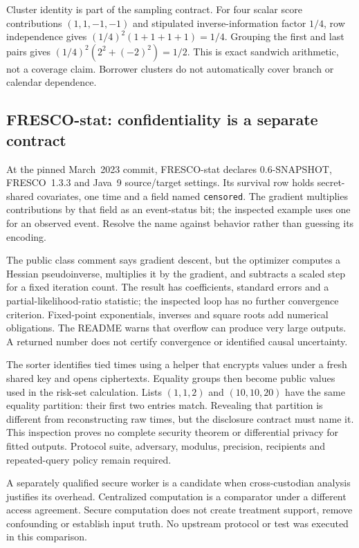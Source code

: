 Cluster identity is part of the sampling contract. For four scalar score
contributions $(1,1,-1,-1)$ and stipulated inverse-information factor $1/4$,
row independence gives $(1/4)^2(1+1+1+1)=1/4$. Grouping the first and last
pairs gives $(1/4)^2(2^2+(-2)^2)=1/2$. This is exact sandwich arithmetic,
not a coverage claim. Borrower clusters do not automatically cover branch
or calendar dependence. \citep{exec24_longjava_reference}

\subsection{FRESCO-stat: confidentiality is a separate contract}
At the pinned March~2023 commit, FRESCO-stat declares 0.6-SNAPSHOT,
FRESCO~1.3.3 and Java~9 source/target settings. Its survival row holds
secret-shared covariates, one time and a field named \texttt{censored}.
The gradient multiplies contributions by that field as an event-status bit;
the inspected example uses one for an observed event. Resolve the name
against behavior rather than guessing its encoding.
\citep{exec24_longjava_fresco}

The public class comment says gradient descent, but the optimizer computes
a Hessian pseudoinverse, multiplies it by the gradient, and subtracts a
scaled step for a fixed iteration count. The result has coefficients,
standard errors and a partial-likelihood-ratio statistic; the inspected loop
has no further convergence criterion. Fixed-point exponentials, inverses
and square roots add numerical obligations. The README warns that overflow
can produce very large outputs. A returned number does not certify
convergence or identified causal uncertainty. \citep{exec24_longjava_fresco}

The sorter identifies tied times using a helper that encrypts values under
a fresh shared key and opens ciphertexts. Equality groups then become public
values used in the risk-set calculation. Lists $(1,1,2)$ and $(10,10,20)$
have the same equality partition: their first two entries match. Revealing
that partition is different from reconstructing raw times, but the disclosure
contract must name it. This inspection proves no complete security theorem
or differential privacy for fitted outputs. Protocol suite, adversary,
modulus, precision, recipients and repeated-query policy remain required.
\citep{exec24_longjava_fresco,exec24_longjava_reference}

A separately qualified secure worker is a candidate when cross-custodian
analysis justifies its overhead. Centralized computation is a comparator
under a different access agreement. Secure computation does not create
treatment support, remove confounding or establish input truth. No upstream
protocol or test was executed in this comparison.
\citep{exec24_longjava_fresco}

